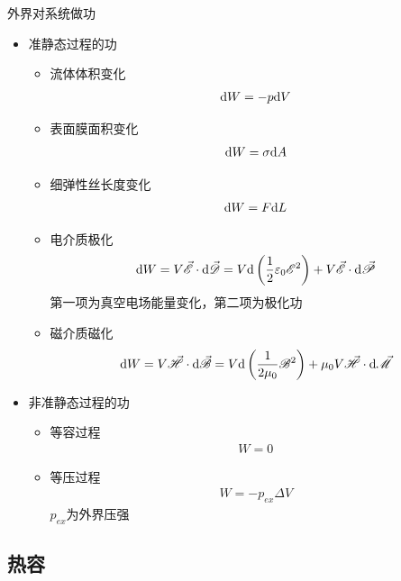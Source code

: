 外界对系统做功
\begin{itemize}
    \item 准静态过程的功
    \begin{itemize}
        \item 流体体积变化
        \begin{gather*}
            \mathrm{d} W = -p \mathrm{d} V
        \end{gather*}
        \item 表面膜面积变化
        \begin{gather*}
            \mathrm{d} W = \sigma \mathrm{d} A
        \end{gather*}
        \item 细弹性丝长度变化
        \begin{gather*}
            \mathrm{d} W = F \mathrm{d} L
        \end{gather*}
        \item 电介质极化
        \begin{gather*}
            \mathrm{d} W = V \vec{\mathscr{E}} \cdot \mathrm{d} \vec{\mathscr{D}} = V \mathrm{d} \left(\frac{1}{2} \varepsilon_0 \mathscr{E}^2 \right) + V \vec{\mathscr{E}} \cdot \mathrm{d} \vec{\mathscr{P}}
        \end{gather*}
        第一项为真空电场能量变化，第二项为极化功
        \item 磁介质磁化
        \begin{gather*}
            \mathrm{d} W = V \vec{\mathscr{H}} \cdot \mathrm{d} \vec{\mathscr{B}} = V \mathrm{d} \left(\frac{1}{2\mu_0} \mathscr{B}^2 \right) + \mu_0 V \vec{\mathscr{H}} \cdot \mathrm{d} \vec{\mathscr{M}}
        \end{gather*}
    \end{itemize}
    \item 非准静态过程的功
    \begin{itemize}
        \item 等容过程
        \begin{gather*}
            W = 0
        \end{gather*}
        \item 等压过程
        \begin{gather*}
            W = -p_{ex} \Delta V
        \end{gather*}
        $p_{ex}$为外界压强
    \end{itemize}
\end{itemize}

\subsection{热容}

